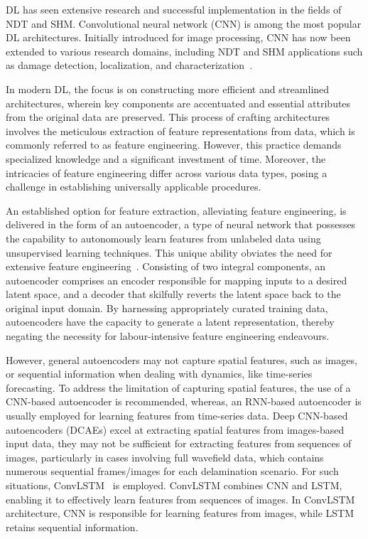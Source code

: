 \documentclass[pdflatex,sn-mathphys-num]{sn-jnl}%
\begin{document}
	DL has seen extensive research and successful implementation in the fields 
	of NDT and SHM. 
	Convolutional neural network (CNN) is among the most popular DL 
	architectures. 
	Initially introduced for image processing, CNN has now been extended to 
	various research domains, including NDT and SHM applications such as damage 
	detection, localization, and characterization~\cite{rautela2019deep, 
	pandey2022explainable, ijjeh2021full, ijjeh2022deep}.
	
	In modern DL, the focus is on constructing more efficient and streamlined 
	architectures, wherein key components are accentuated and essential 
	attributes from the original data are preserved. 
	This process of crafting architectures involves the meticulous extraction 
	of feature representations from data, which is commonly referred to as 
	feature engineering. 
	However, this practice demands specialized knowledge and a significant 
	investment of time. 
	Moreover, the intricacies of feature engineering differ across various data 
	types, posing a challenge in establishing universally applicable procedures.
	
	An established option for feature extraction, alleviating feature 
	engineering, 
	is delivered in the form of an autoencoder, a type of neural network that 
	possesses the capability to autonomously learn features from unlabeled data 
	using unsupervised learning techniques. 
	This unique ability obviates the need for extensive feature 
	engineering~\cite{pinaya2020autoencoders, ardelean2023study, 
		simpson2021machine}. 
	Consisting of two integral components, an autoencoder comprises an encoder 
	responsible for mapping inputs to a desired latent space, and a decoder 
	that skilfully reverts the latent space back to the original input domain. 
	By harnessing appropriately curated training data, autoencoders have the 
	capacity to generate a latent representation, thereby negating the 
	necessity for labour-intensive feature engineering endeavours.
	
	However, general autoencoders may not capture spatial features, such as 
	images, or sequential information when dealing with dynamics, like 
	time-series forecasting. 
	To address the limitation of capturing spatial features, the use of a 
	CNN-based autoencoder is recommended, whereas, an RNN-based autoencoder is 
	usually employed for learning features from time-series data.
	Deep CNN-based autoencoders (DCAEs) excel at extracting spatial features 
	from images-based input data, they may not be sufficient for extracting 
	features from sequences of images, particularly in cases involving full 
	wavefield data, which contains numerous sequential frames/images for each 
	delamination scenario. 
	For such situations, ConvLSTM~\cite{shi2015convolutional} is employed. 
	ConvLSTM combines CNN and LSTM, enabling it to effectively learn features 
	from sequences of images. 
	In ConvLSTM architecture, CNN is responsible for learning features from 
	images, while LSTM retains sequential information.
	
\end{document}

